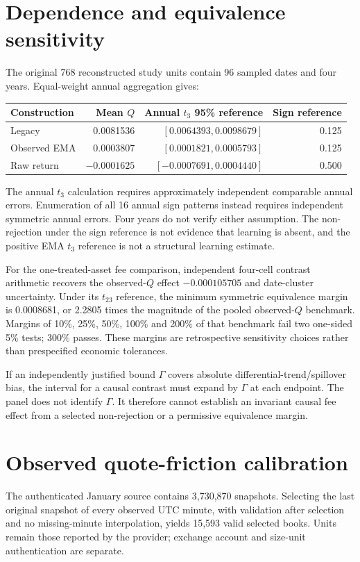 \documentclass[11pt]{article}
\begin{document}
\section{Dependence and equivalence sensitivity}
The original 768 reconstructed study units contain 96 sampled dates and four years. Equal-weight annual aggregation gives:
\begin{center}
\begin{tabular}{lrrr}\toprule
Construction & Mean $Q$ & Annual $t_3$ 95\% reference & Sign reference \\\midrule
Legacy & 0.0081536 & $[0.0064393,0.0098679]$ & 0.125 \\
Observed EMA & 0.0003807 & $[0.0001821,0.0005793]$ & 0.125 \\
Raw return & $-0.0001625$ & $[-0.0007691,0.0004440]$ & 0.500 \\
\bottomrule\end{tabular}\end{center}

The annual $t_3$ calculation requires approximately independent comparable annual errors. Enumeration of all 16 annual sign patterns instead requires independent symmetric annual errors. Four years do not verify either assumption. The non-rejection under the sign reference is not evidence that learning is absent, and the positive EMA $t_3$ reference is not a structural learning estimate.

For the one-treated-asset fee comparison, independent four-cell contrast arithmetic recovers the observed-$Q$ effect $-0.000105705$ and date-cluster uncertainty. Under its $t_{23}$ reference, the minimum symmetric equivalence margin is 0.0008681, or 2.2805 times the magnitude of the pooled observed-$Q$ benchmark. Margins of 10\%, 25\%, 50\%, 100\% and 200\% of that benchmark fail two one-sided 5\% tests; 300\% passes. These margins are retrospective sensitivity choices rather than prespecified economic tolerances.

If an independently justified bound $\Gamma$ covers absolute differential-trend/spillover bias, the interval for a causal contrast must expand by $\Gamma$ at each endpoint. The panel does not identify $\Gamma$. It therefore cannot establish an invariant causal fee effect from a selected non-rejection or a permissive equivalence margin.

\section{Observed quote-friction calibration}
The authenticated January source contains 3,730,870 snapshots. Selecting the last original snapshot of every observed UTC minute, with validation after selection and no missing-minute interpolation, yields 15,593 valid selected books. Units remain those reported by the provider; exchange account and size-unit authentication are separate.
\end{document}
